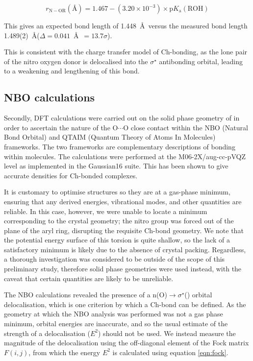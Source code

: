 \begin{refsection}
\begin{equation}
	r_{\mathrm{N-OR}} (\text{\AA}) = 1.467 - (3.20\times10^{-3}) \times \mathrm{p}K_{\mathrm{a}}(\mathrm{ROH})
	\label{eqn:scp}
\end{equation}

This gives an expected bond length of 1.448~\AA~versus the measured bond length 1.489(2)~\AA ($\Delta = 0.041$~\AA~$= 13.7\sigma$).

This is consistent with the charge transfer model of Ch-bonding, as the lone pair of the nitro oxygen donor is delocalised into the $\sigma^{\star}$ antibonding orbital, leading to a weakening and lengthening of this bond.\autocite{Reed1988}

\subsection{NBO calculations}
Secondly, DFT calculations were carried out on the solid phase geometry of  in order to ascertain the nature of the O$\cdots$O close contact within the NBO (Natural Bond Orbital) and QTAIM (Quantum Theory of Atoms In Molecules) frameworks.\autocite{Bader1991,NBO7}
The two frameworks are complementary descriptions of bonding within molecules.
The calculations were performed at the M06-2X/aug-cc-pVQZ level as implemented in the Gaussian16 suite.\autocite{gaussian16,Zhao2008,Woon1995}
This has been shown to give accurate densities for Ch-bonded complexes.\autocite{Kim2019}

It is customary to optimise structures so they are at a gas-phase minimum, ensuring that any derived energies, vibrational modes, and other quantities are reliable. 
In this case, however, we were unable to locate a minimum corresponding to the crystal geometry; the nitro group was forced out of the plane of the aryl ring, disrupting the requisite Ch-bond geometry.
We note that the potential energy surface of this torsion is quite shallow, so the lack of a satisfactory minimum is likely due to the absence of crystal packing.
Regardless, a thorough investigation was considered to be outside of the scope of this preliminary study, therefore solid phase geometries were used instead, with the caveat that certain quantities are likely to be unreliable.

The NBO calculations revealed the presence of a n(O)$\rightarrow \sigma^{\star}$() orbital delocalisation, which is one criterion by which a Ch-bond can be defined.\autocite{Pascoe2017}
As the geometry at which the NBO analysis was performed was not a gas phase minimum, orbital energies are inaccurate, and so the usual estimate of the strength of a delocalisation ($E^2$) should not be used.
We instead measure the magnitude of the delocalisation using the off-diagonal element of the Fock matrix $F(i,j)$, from which the energy $E^2$ is calculated using equation \cref{eqn:fock}.


\end{refsection}
